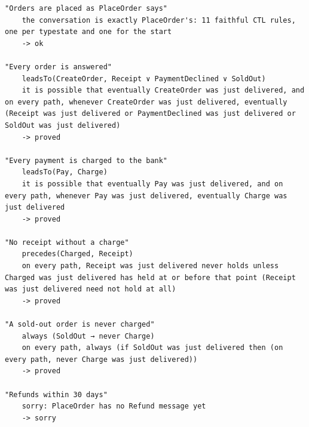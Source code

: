 \begin{lstlisting}[language={},basicstyle=\ttfamily\footnotesize,breaklines=true]
"Orders are placed as PlaceOrder says"
    the conversation is exactly PlaceOrder's: 11 faithful CTL rules, one per typestate and one for the start
    -> ok

"Every order is answered"
    leadsTo(CreateOrder, Receipt ∨ PaymentDeclined ∨ SoldOut)
    it is possible that eventually CreateOrder was just delivered, and on every path, whenever CreateOrder was just delivered, eventually (Receipt was just delivered or PaymentDeclined was just delivered or SoldOut was just delivered)
    -> proved

"Every payment is charged to the bank"
    leadsTo(Pay, Charge)
    it is possible that eventually Pay was just delivered, and on every path, whenever Pay was just delivered, eventually Charge was just delivered
    -> proved

"No receipt without a charge"
    precedes(Charged, Receipt)
    on every path, Receipt was just delivered never holds unless Charged was just delivered has held at or before that point (Receipt was just delivered need not hold at all)
    -> proved

"A sold-out order is never charged"
    always (SoldOut → never Charge)
    on every path, always (if SoldOut was just delivered then (on every path, never Charge was just delivered))
    -> proved

"Refunds within 30 days"
    sorry: PlaceOrder has no Refund message yet
    -> sorry
\end{lstlisting}

